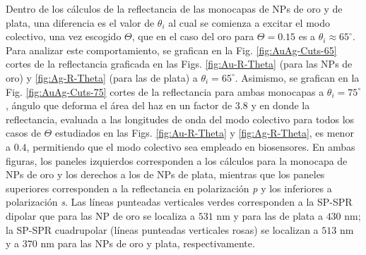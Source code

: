 Dentro de los cálculos de la reflectancia de las monocapas de NPs de oro y de plata, una diferencia es el valor de $\theta_i$ al cual se comienza a excitar el modo colectivo, una vez escogido $\Theta$, que en el caso del oro para $\Theta=0.15$ es a $\theta_i\approx 65^\circ$. Para analizar este comportamiento, se grafican en la Fig. \ref{fig:AuAg-Cuts-65} cortes de la reflectancia graficada en las Figs. \ref{fig:Au-R-Theta} (para las NPs de oro) y \ref{fig:Ag-R-Theta} (para las de plata) a $\theta_i=65^\circ$. Asimismo, se grafican en la Fig. \ref{fig:AuAg-Cuts-75} cortes de la reflectancia para ambas monocapas a $\theta_i=75^\circ$, ángulo que deforma el área del haz en un factor de $3.8$ y en donde  la reflectancia, evaluada a las longitudes de onda del modo colectivo para todos los casos de $\Theta$ estudiados en las Figs.  \ref{fig:Au-R-Theta} y  \ref{fig:Ag-R-Theta}, es menor a $0.4$, permitiendo que el modo colectivo sea empleado en biosensores. En ambas figuras, los paneles izquierdos corresponden a los cálculos para la monocapa de NPs de oro y los derechos a los de NPs de plata, mientras que los paneles superiores corresponden a la reflectancia en polarización \emph{p} y los inferiores a polarización \emph{s}. Las líneas punteadas verticales verdes corresponden a la SP-SPR dipolar que para las NP de oro se localiza a $531$ nm y para las de plata a $430$ nm; la SP-SPR cuadrupolar (líneas punteadas verticales rosas) se localizan a $513$ nm y a $370$ nm para las NPs de oro y plata, respectivamente.

